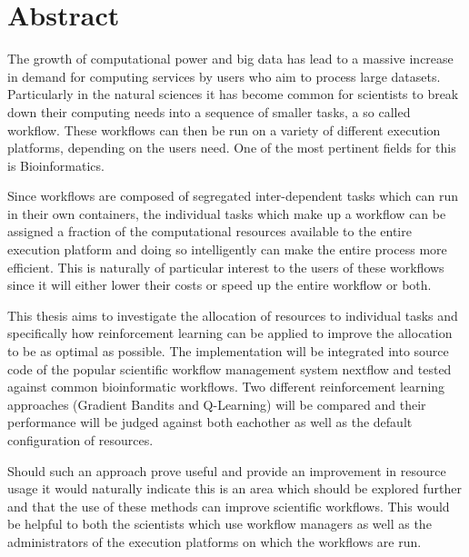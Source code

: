 
\cleardoublepage
{}
\section*{Abstract}

The growth of computational power and big data has lead to a massive increase in demand for computing services by users who aim to process large datasets. Particularly in the natural sciences it has become common for scientists to break down their computing needs into a sequence of smaller tasks, a so called workflow. These workflows can then be run on a variety of different execution platforms, depending on the users need.  One of the most pertinent fields for this is Bioinformatics.

Since workflows are composed of segregated inter-dependent tasks which can run in their own containers, the individual tasks which make up a workflow can be assigned a fraction of the computational resources available to the entire execution platform and doing so intelligently can make the entire process more efficient. This is naturally of particular interest to the users of these workflows since it will either lower their costs or speed up the entire workflow or both. 

This thesis aims to investigate the allocation of resources to individual tasks and specifically how reinforcement learning can be applied to improve the allocation to be as optimal as possible. The implementation will be integrated into source code  of the popular scientific workflow management system nextflow and tested against common bioinformatic workflows. Two different reinforcement learning approaches (Gradient Bandits and Q-Learning) will be compared and their performance will be judged against both eachother as well as the default configuration of resources.

Should such an approach prove useful and provide an improvement in resource usage it would naturally indicate this is an area which should be explored further and that the use of these methods can improve scientific workflows. This would be helpful to both the scientists which use workflow managers as well as the administrators of the execution platforms on which the workflows are run.



